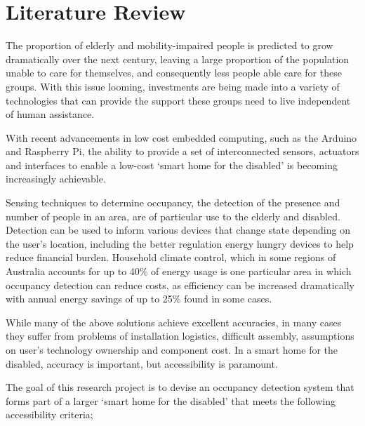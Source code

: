 \documentclass[../thesis/thesis.tex]{subfiles}
\begin{document}
\chapter{Literature Review}
\label{chap:litreview}

The proportion of elderly and mobility-impaired people is predicted to grow dramatically over the next century, leaving a large proportion of the population unable to care for themselves, and consequently less people able care for these groups. \cite{chan2009smart} With this issue looming, investments are being made into a variety of technologies that can provide the support these groups need to live independent of human assistance. 

With recent advancements in low cost embedded computing, such as the Arduino and Raspberry Pi, the ability to provide a set of interconnected sensors, actuators and interfaces to enable a low-cost `smart home for the disabled' is becoming increasingly achievable.

Sensing techniques to determine occupancy, the detection of the presence and number of people in an area, are of particular use to the elderly and disabled. Detection can be used to inform various devices that change state depending on the user's location, including the better regulation energy hungry devices to help reduce financial burden. Household climate control, which in some regions of Australia accounts for up to 40\% of energy usage \cite{abs4602} is one particular area in which occupancy detection can reduce costs, as efficiency can be increased dramatically with annual energy savings of up to 25\% found in some cases. \cite{beltran2013thermosense}
 
While many of the above solutions achieve excellent accuracies, in many cases they suffer from problems of installation logistics, difficult assembly, assumptions on user's technology ownership and component cost. In a smart home for the disabled, accuracy is important, but accessibility is paramount.

The goal of this research project is to devise an occupancy detection system that forms part of a larger `smart home for the disabled' that meets the following accessibility criteria;
\end{document}
